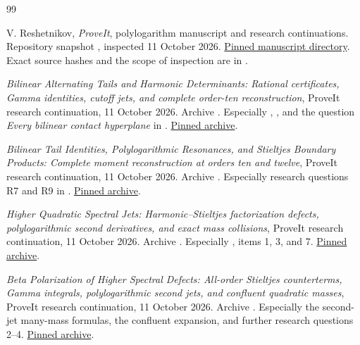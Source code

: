 \begin{thebibliography}{99}
\raggedright

V. Reshetnikov, \emph{ProveIt}, polylogarithm manuscript and research
continuations. Repository snapshot \pin, inspected 11 October 2026.
\href{https://github.com/VladimirReshetnikov/ProveIt/tree/e3d7ec5d3f9be259c1f91edaea4389f4e79b5b03/Analysis/Polylogarithms/docs/manuscript}{Pinned manuscript directory}.
Exact source hashes and the scope of inspection are in
.

\emph{Bilinear Alternating Tails and Harmonic Determinants:
Rational certificates, Gamma identities, cutoff jets, and complete
order-ten reconstruction}, ProveIt research continuation, 11 October 2026.
Archive .
Especially ,
, and the question
\emph{Every bilinear contact hyperplane} in
.
\href{https://github.com/VladimirReshetnikov/ProveIt/blob/e3d7ec5d3f9be259c1f91edaea4389f4e79b5b03/docs/incoming/ProveIt_Bilinear_Tails_and_Determinants_2026-10-11.zip}{Pinned archive}.

\emph{Bilinear Tail Identities, Polylogarithmic Resonances, and Stieltjes
Boundary Products: Complete moment reconstruction at orders ten and twelve},
ProveIt research continuation, 11 October 2026.
Archive .
Especially research questions R7 and R9 in
.
\href{https://github.com/VladimirReshetnikov/ProveIt/blob/e3d7ec5d3f9be259c1f91edaea4389f4e79b5b03/docs/incoming/ProveIt_Tail_Kernels_and_Boundary_Products_2026-10-11.zip}{Pinned archive}.

\emph{Higher Quadratic Spectral Jets: Harmonic--Stieltjes factorization
defects, polylogarithmic second derivatives, and exact mass collisions},
ProveIt research continuation, 11 October 2026.
Archive .
Especially , items 1, 3, and 7.
\href{https://github.com/VladimirReshetnikov/ProveIt/blob/e3d7ec5d3f9be259c1f91edaea4389f4e79b5b03/docs/incoming/ProveIt_Higher_Quadratic_Jets_2026-10-11.zip}{Pinned archive}.

\emph{Beta Polarization of Higher Spectral Defects: All-order Stieltjes
counterterms, Gamma integrals, polylogarithmic second jets, and confluent
quadratic masses}, ProveIt research continuation, 11 October 2026.
Archive .
Especially the second-jet many-mass formulas, the confluent expansion, and
further research questions 2--4.
\href{https://github.com/VladimirReshetnikov/ProveIt/blob/e3d7ec5d3f9be259c1f91edaea4389f4e79b5b03/docs/incoming/ProveIt_Higher_Spectral_Defects_2026-10-11.zip}{Pinned archive}.


\end{thebibliography}
